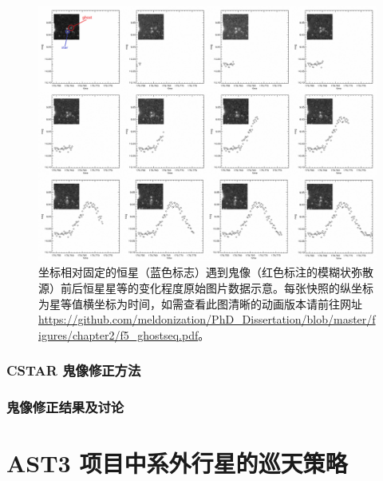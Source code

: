 \begin{figure}
\centering
\includegraphics[scale=0.88]{figures/chapter2/f5_ghostseq.pdf}
\caption[坐标相对固定的恒星（蓝色标志）遇到鬼像（红色标注的模糊状弥散源）前后恒星星等的变化程度原始图片数据示意。]{坐标相对固定的恒星（蓝色标志）遇到鬼像（红色标注的模糊状弥散源）前后恒星星等的变化程度原始图片数据示意。每张快照的纵坐标为星等值横坐标为时间，如需查看此图清晰的动画版本请前往网址 \url{https://github.com/meldonization/PhD_Dissertation/blob/master/figures/chapter2/f5_ghostseq.pdf}。}
\label{fig:ghostseq}
\end{figure}


\subsubsection{CSTAR 鬼像修正方法}


\subsubsection{鬼像修正结果及讨论}

\section{AST3 项目中系外行星的巡天策略} \label{sec:ast3}



